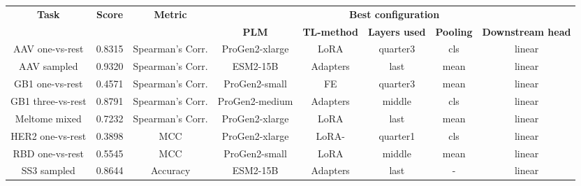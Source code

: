 \documentclass{standalone}
\begin{document}
\begin{tabular}{c|ccccccc}
\hline
\multirow{2}{*}{\textbf{Task}} & \multicolumn{1}{c|}{\multirow{2}{*}{\textbf{Score}}} & \multicolumn{1}{c|}{\multirow{2}{*}{\textbf{Metric}}} & \multicolumn{5}{c}{\textbf{Best configuration}} \\ \cline{4-8}
 & \multicolumn{1}{c|}{} & \multicolumn{1}{c|}{} & \textbf{PLM} & \textbf{TL-method} & \textbf{Layers used} & \textbf{Pooling} & \textbf{Downstream head} \\ \hline
AAV one-vs-rest & 0.8315 & Spearman's Corr. & ProGen2-xlarge & LoRA & quarter3 & cls & linear \\ \hline
AAV sampled & 0.9320 & Spearman's Corr. & ESM2-15B & Adapters & last & mean & linear \\ \hline
GB1 one-vs-rest & 0.4571 & Spearman's Corr. & ProGen2-small & FE & quarter3 & mean & linear \\ \hline
GB1 three-vs-rest & 0.8791 & Spearman's Corr. & ProGen2-medium & Adapters & middle & cls & linear \\ \hline
Meltome mixed & 0.7232 & Spearman's Corr. & ProGen2-xlarge & LoRA & last & mean & linear \\ \hline
HER2 one-vs-rest & 0.3898 & MCC & ProGen2-xlarge & LoRA- & quarter1 & cls & linear \\ \hline
RBD one-vs-rest & 0.5545 & MCC & ProGen2-small & LoRA & middle & mean & linear \\ \hline
SS3 sampled & 0.8644 & Accuracy & ESM2-15B & Adapters & last & - & linear \\ \hline
\end{tabular}
\end{document}
